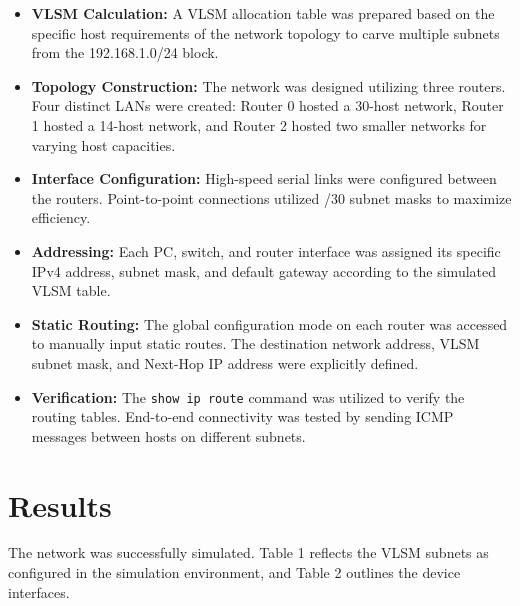 \documentclass[11pt]{article}
\begin{document}
\begin{itemize}
    \item \textbf{VLSM Calculation:} A VLSM allocation table was prepared based on the specific host requirements of the network topology to carve multiple subnets from the 192.168.1.0/24 block.
    \item \textbf{Topology Construction:} The network was designed utilizing three routers. Four distinct LANs were created: Router 0 hosted a 30-host network, Router 1 hosted a 14-host network, and Router 2 hosted two smaller networks for varying host capacities.
    \item \textbf{Interface Configuration:} High-speed serial links were configured between the routers. Point-to-point connections utilized /30 subnet masks to maximize efficiency.
    \item \textbf{Addressing:} Each PC, switch, and router interface was assigned its specific IPv4 address, subnet mask, and default gateway according to the simulated VLSM table.
    \item \textbf{Static Routing:} The global configuration mode on each router was accessed to manually input static routes. The destination network address, VLSM subnet mask, and Next-Hop IP address were explicitly defined.
    \item \textbf{Verification:} The \texttt{show ip route} command was utilized to verify the routing tables. End-to-end connectivity was tested by sending ICMP messages between hosts on different subnets.
\end{itemize}

\section{Results}
The network was successfully simulated. Table 1 reflects the VLSM subnets as configured in the simulation environment, and Table 2 outlines the device interfaces.
\end{document}
